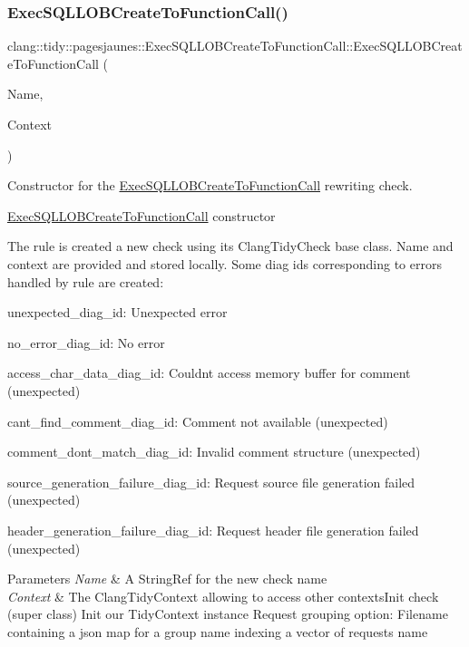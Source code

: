 \subsubsection{\texorpdfstring{Exec\+S\+Q\+L\+L\+O\+B\+Create\+To\+Function\+Call()}{ExecSQLLOBCreateToFunctionCall()}}
{\footnotesize\ttfamily clang\+::tidy\+::pagesjaunes\+::\+Exec\+S\+Q\+L\+L\+O\+B\+Create\+To\+Function\+Call\+::\+Exec\+S\+Q\+L\+L\+O\+B\+Create\+To\+Function\+Call (\begin{DoxyParamCaption}\item[{String\+Ref}]{Name,  }\item[{Clang\+Tidy\+Context $\ast$}]{Context }\end{DoxyParamCaption})}



Constructor for the \hyperlink{classclang_1_1tidy_1_1pagesjaunes_1_1_exec_s_q_l_l_o_b_create_to_function_call}{Exec\+S\+Q\+L\+L\+O\+B\+Create\+To\+Function\+Call} rewriting check. 

\hyperlink{classclang_1_1tidy_1_1pagesjaunes_1_1_exec_s_q_l_l_o_b_create_to_function_call}{Exec\+S\+Q\+L\+L\+O\+B\+Create\+To\+Function\+Call} constructor

The rule is created a new check using its {\ttfamily Clang\+Tidy\+Check} base class. Name and context are provided and stored locally. Some diag ids corresponding to errors handled by rule are created\+:
\begin{DoxyItemize}
\item unexpected\+\_\+diag\+\_\+id\+: Unexpected error
\item no\+\_\+error\+\_\+diag\+\_\+id\+: No error
\item access\+\_\+char\+\_\+data\+\_\+diag\+\_\+id\+: Couldn\textquotesingle{}t access memory buffer for comment (unexpected)
\item cant\+\_\+find\+\_\+comment\+\_\+diag\+\_\+id\+: Comment not available (unexpected)
\item comment\+\_\+dont\+\_\+match\+\_\+diag\+\_\+id\+: Invalid comment structure (unexpected)
\item source\+\_\+generation\+\_\+failure\+\_\+diag\+\_\+id\+: Request source file generation failed (unexpected)
\item header\+\_\+generation\+\_\+failure\+\_\+diag\+\_\+id\+: Request header file generation failed (unexpected)
\end{DoxyItemize}


\begin{DoxyParams}{Parameters}
{\em Name} & A String\+Ref for the new check name \\
\hline
{\em Context} & The Clang\+Tidy\+Context allowing to access other contexts\+Init check (super class) Init our Tidy\+Context instance Request grouping option\+: Filename containing a json map for a group name indexing a vector of requests name \\
\hline
\end{DoxyParams}



